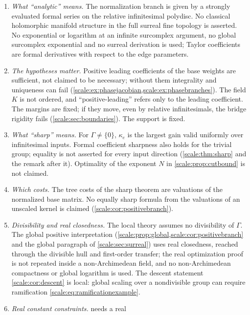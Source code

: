 \documentclass[11pt,a4paper]{article}
\numberwithin{equation}{section}
\theoremstyle{definition}
\begin{document}
\begin{enumerate}[label=(N\arabic*),leftmargin=3.2em]
summability alone does not imply convergence of partial sums
(\cref{scale:sec:boundaries}). The remainder certificate
(\cref{scale:cor:remainder}) does not promise that a finite Taylor degree
reaches every requested precision at higher rank.
\item \emph{What ``analytic'' means.} The normalization branch is given by a
strongly evaluated formal series on the relative infinitesimal polydisc. No
classical holomorphic manifold structure in the full surreal fine topology
is asserted. No exponential or logarithm at an infinite surcomplex argument,
no global surcomplex exponential and no surreal derivation is used; Taylor
coefficients are formal derivatives with respect to the edge parameters.
\item \emph{The hypotheses matter.} Positive leading coefficients of the
base weights are sufficient, not claimed to be necessary; without them
integrality and uniqueness can fail
(\cref{scale:ex:phasejacobian,scale:ex:phasebranches}). The field $K$ is not
ordered, and ``positive-leading'' refers only to the leading coefficient.
The margins are fixed; if they move, even by relative infinitesimals, the
bridge rigidity fails (\cref{scale:sec:boundaries}). The support is fixed.
\item \emph{What ``sharp'' means.} For $\Gamma\ne\{0\}$,
$\kappa_e$ is the largest gain valid uniformly over infinitesimal inputs.
Formal coefficient sharpness also holds for the trivial group;
equality is not asserted for every input direction
(\cref{scale:thm:sharp} and the remark after it). Optimality of the exponent
$N$ in \cref{scale:prop:cutbound} is not claimed.
\item \emph{Which costs.} The tree costs of the sharp theorem are valuations
of the normalized base matrix. No equally sharp formula from the valuations
of an unscaled kernel is claimed (\cref{scale:cor:positivebranch}).
\item \emph{Divisibility and real closedness.} The local theory assumes no
divisibility of $\Gamma$. The global positive interpretation
(\cref{scale:prop:global,scale:cor:positivebranch} and the global paragraph
of \cref{scale:sec:surreal}) uses real closedness, reached through the
divisible hull and first-order transfer; the real optimization proof is not
repeated inside a non-Archimedean field, and no non-Archimedean compactness
or global logarithm is used. The descent statement \cref{scale:cor:descent}
is local: global scaling over a nondivisible group can require ramification
\eqref{scale:eq:ramificationexample}.
\item \emph{Real constant constraints.}  needs a real

\end{enumerate}
\end{document}
